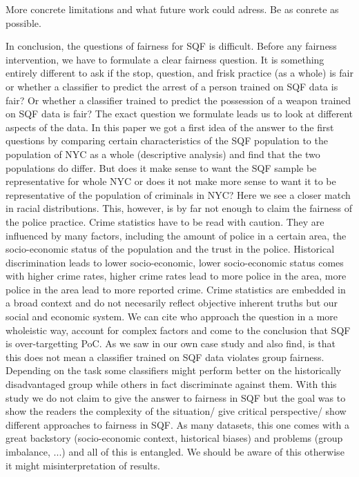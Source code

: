 
More concrete limitations and what future work could adress. Be as conrete as possible.

In conclusion, the questions of fairness for SQF is difficult.
Before any fairness intervention, we have to formulate a clear fairness question. It is something entirely different to ask if the stop, question, and frisk practice (as a whole) is fair or whether a classifier to predict the arrest of a person trained on SQF data is fair? Or whether a classifier trained to predict the possession of a weapon trained on SQF data is fair?
The exact question we formulate leads us to look at different aspects of the data. In this paper we got a first idea of the answer to the first questions by comparing certain characteristics of the SQF population to the population of NYC as a whole (descriptive analysis) and find that the two populations do differ. But does it make sense to want the SQF sample be representative for whole NYC or does it not make more sense to want it to be representative of the population of criminals in NYC?
Here we see a closer match in racial distributions. This, however, is by far not enough to claim the fairness of the police practice. Crime statistics have to be read with caution. They are influenced by many factors, including the amount of police in a certain area, the socio-economic status of the population and the trust in the police. Historical discrimination leads to lower socio-economic, lower socio-economic status comes with higher crime rates, higher crime rates lead to more police in the area, more police in the area lead to more reported crime. Crime statistics are embedded in a broad context and do not necesarily reflect objective inherent truths but our social and economic system.
We can cite \cite{goel2016} who approach the question in a more wholeistic way, account for complex factors and come to the conclusion that SQF is over-targetting PoC.
As we saw in our own case study and \cite{Badr2022DTFANSP} also find, is that this does not mean a classifier trained on SQF data violates group fairness. Depending on the task some classifiers might perform better on the historically disadvantaged group while others in fact discriminate against them.
With this study we do not claim to give the answer to fairness in SQF but the goal was to show the readers the complexity of the situation/ give critical perspective/ show different approaches to fairness in SQF. As many datasets, this one comes with a great backstory (socio-economic context, historical biases) and problems (group imbalance, ...) and all of this is entangled. We should be aware of this otherwise it might misinterpretation of results.


